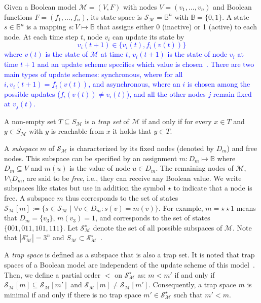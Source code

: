\documentclass[runningheads]{llncs}
\newcommand{\revise}[1]{\textcolor{blue}{#1}}
\begin{document}
Given a Boolean model \(\mathcal{M} = (V, F)\) with nodes \(V=(v_{1},\dots,v_{n})\) and Boolean functions \(F=(f_{1},\dots,f_{n})\), its state-space is \(\mathcal{S}_{\mathcal{M}} =\mathbb{B}^{n}\) with \(\mathbb{B} = \{0, 1\}\). A state \(s \in \mathbb{B}^{n}\) is a mapping \(s \colon V \mapsto \mathbb{B}\) that assigns either 0 (inactive) or 1 (active) to each node. At each time step \(t\), node \(v_i\) can update its state by
\revise{\[v_i(t + 1) \in \{v_{i}(t), f_i(v(t))\}\]
where \(v(t)\) is the state of \(\mathcal{M}\) at time \(t\), \(v_i(t + 1)\) is the state of node \(v_i\) at time \(t + 1\) and an update scheme specifies which value is chosen~\cite{thomas1991regulatory}.
There are two main types of update schemes: synchronous, where for all \(i, v_{i}(t+1) = f_{i}(v(t))\), and asynchronous, where an \(i\) is chosen among the possible updates (\(f_{i}(v(t))\neq v_{i}(t)\)), and all the other nodes \(j\) remain fixed at \(v_{j}(t)\).}

A non-empty set \(T \subseteq S_{\mathcal{M}}\) is a \emph{trap set} of \(\mathcal{M}\) if and only if for every \(x \in T\) and \(y \in S_{\mathcal{M}}\) with \(y\) is reachable from \(x\) it holds that \(y \in T\).

A \emph{subspace} \(m\) of \(\mathcal{S}_{\mathcal{M}}\) is characterized by its fixed nodes (denoted by \(D_m\)) and free nodes.
This subspace can be specified by an assignment \(m : D_m \mapsto \mathbb{B}\) where \(D_m \subseteq V\) and \(m(u)\) is the value of node \(u \in D_m\).
The remaining nodes of \(\mathcal{M}\), \(V \setminus D_m\), are said to be \emph{free}, i.e., they can receive any Boolean value.
We write subspaces like states but use in addition the symbol \(\star\) to indicate that a node is free.
A subspace \(m\) thus corresponds to the set of states \(\mathcal{S}_{\mathcal{M}}[m] := \{s \in \mathcal{S}_{\mathcal{M}}\;|\;\forall v \in D_m : s(v) = m(v)\}\).
For example, \(m = \star\star1\) means that \(D_m = \{v_3\}\), \(m(v_3) = 1\), and corresponds to the set of states \(\{001, 011, 101, 111\}\).
Let \(\mathcal{S}_{\mathcal{M}}^{\star}\) denote the set of all possible subspaces of \(\mathcal{M}\). Note that \(\left|\mathcal{S}_{\mathcal{M}}^{\star}\right| = 3^n\) and \(S_{\mathcal{M}} \subset \mathcal{S}_{\mathcal{M}}^{\star}\)~\cite{klarner2015computing}.

A \emph{trap space} is defined as a subspace that is also a trap set.
It is noted that trap spaces of a Boolean model are independent of the update scheme of this model~\cite{klarner2015computing}.
Then, we define a partial order \(<\) on \(\mathcal{S}_{\mathcal{M}}^{\star}\) as: \(m < m'\) if and only if \(\mathcal{S}_{\mathcal{M}}[m] \subseteq \mathcal{S}_{\mathcal{M}}[m']\) and \(\mathcal{S}_{\mathcal{M}}[m] \neq \mathcal{S}_{\mathcal{M}}[m']\).
Consequently, a trap space \(m\) is minimal if and only if there is no trap space \(m' \in \mathcal{S}_{\mathcal{M}}^{\star}\) such that \(m' < m\).
\end{document}
